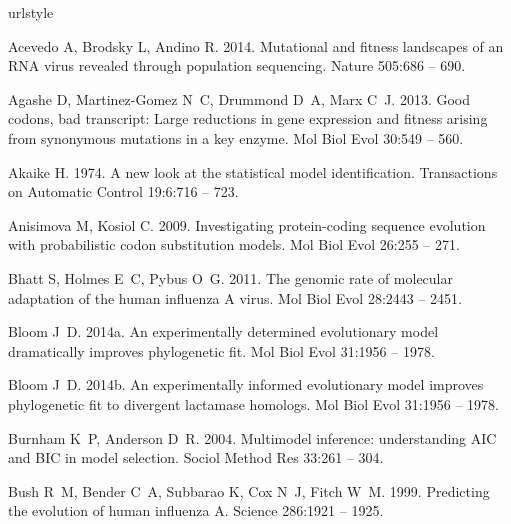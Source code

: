 \documentclass[11pt]{article}
\begin{document}
\begin{thebibliography}{79}
\providecommand{\natexlab}[1]{#1}
\expandafter\ifx\csname urlstyle\endcsname\relax
  \providecommand{\doi}[1]{doi:\discretionary{}{}{}#1}\else
  \providecommand{\doi}{doi:\discretionary{}{}{}\begingroup
  \urlstyle{rm}\Url}\fi

Acevedo A, Brodsky L, Andino R. 2014.
\newblock Mutational and fitness landscapes of an {RNA} virus revealed through
  population sequencing.
\newblock Nature 505:686 -- 690.

Agashe D, Martinez-Gomez N~C, Drummond D~A, Marx C~J. 2013.
\newblock Good codons, bad transcript: Large reductions in gene expression and
  fitness arising from synonymous mutations in a key enzyme.
\newblock Mol Biol Evol 30:549 -- 560.

Akaike H. 1974.
\newblock A new look at the statistical model identification.
 Transactions on Automatic Control 19:6:716 -- 723.

Anisimova M, Kosiol C. 2009.
\newblock Investigating protein-coding sequence evolution with probabilistic
  codon substitution models.
\newblock Mol Biol Evol 26:255 -- 271.

Bhatt S, Holmes E~C, Pybus O~G. 2011.
\newblock The genomic rate of molecular adaptation of the human influenza {A}
  virus.
\newblock Mol Biol Evol 28:2443 -- 2451.

\bibitem[{Bloom(2014{\natexlab{a}})}]{Bloom2014a}
Bloom J~D. 2014{\natexlab{a}}.
\newblock An experimentally determined evolutionary model dramatically improves
  phylogenetic fit.
\newblock Mol Biol Evol 31:1956 -- 1978.

\bibitem[{Bloom(2014{\natexlab{b}})}]{Bloom2014b}
Bloom J~D. 2014{\natexlab{b}}.
\newblock An experimentally informed evolutionary model improves phylogenetic
  fit to divergent lactamase homologs.
\newblock Mol Biol Evol 31:1956 -- 1978.

Burnham K~P, Anderson D~R. 2004.
\newblock Multimodel inference: understanding {AIC} and {BIC} in model
  selection.
\newblock Sociol Method Res 33:261 -- 304.

Bush R~M, Bender C~A, Subbarao K, Cox N~J, Fitch W~M. 1999.
\newblock Predicting the evolution of human influenza {A}.
\newblock Science 286:1921 -- 1925.


\end{thebibliography}
\end{document}
